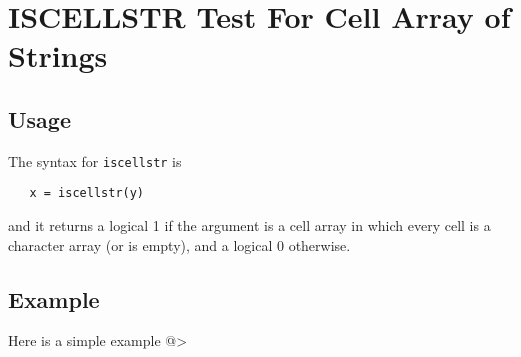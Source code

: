 \section{ISCELLSTR Test For Cell Array of Strings}

\subsection{Usage}

The syntax for \verb|iscellstr| is 
\begin{verbatim}
   x = iscellstr(y)
\end{verbatim}
and it returns a logical 1 if the argument is a cell array
in which every cell is a character array (or is empty), and
a logical 0 otherwise.
\subsection{Example}

Here is a simple example
@>
